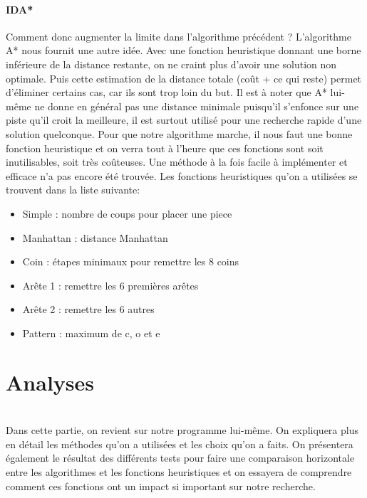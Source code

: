\documentclass[fleqn,10pt,french]{SelfArx} %
\begin{document}
\paragraph{IDA*}
Comment donc augmenter la limite dans l’algorithme précédent ? L’algorithme A* nous fournit une autre idée. Avec une fonction heuristique donnant une borne inférieure de la distance restante, on ne craint plus d’avoir une solution non optimale. Puis cette estimation de la distance totale (coût + ce qui reste) permet d’éliminer certains cas, car ils sont trop loin du but. Il est à noter que A* lui-même ne donne en général pas une distance minimale puisqu’il s’enfonce sur une piste qu’il croit la meilleure, il est surtout utilisé pour une recherche rapide d’une solution quelconque. Pour que notre algorithme marche, il nous faut une bonne fonction heuristique et on verra tout à l’heure que ces fonctions sont soit inutilisables, soit très coûteuses. Une méthode à la fois facile à implémenter et efficace n’a pas encore été trouvée. Les fonctions heuristiques qu’on a utilisées se trouvent dans la liste suivante: 

\begin{itemize}[noitemsep] %
\item Simple : nombre de coups pour placer une piece
\item Manhattan : distance Manhattan
\item Coin : étapes minimaux pour remettre les 8 coins
\item Arête 1 : remettre les 6 premières arêtes
\item Arête 2 : remettre les 6 autres
\item Pattern : maximum de c, o et e
\end{itemize}


\section{Analyses}

~\\\indent
Dans cette partie, on revient sur notre programme lui-même. On expliquera plus en détail les méthodes qu’on a utilisées et les choix qu’on a faits. On présentera également le résultat des différents tests pour faire une comparaison horizontale entre les algorithmes et les fonctions heuristiques et on essayera de comprendre comment ces fonctions ont un impact si important sur notre recherche.
\end{document}
